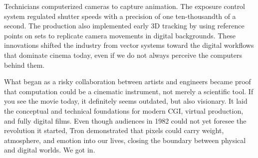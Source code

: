 \documentclass[12pt]{article}
\begin{document}
Technicians computerized cameras to capture animation. The exposure control system regulated shutter speeds with a precision of one ten-thousandth of a second. The production also implemented early 3D tracking by using reference points on sets to replicate camera movements in digital backgrounds. These innovations shifted the industry from vector systems toward the digital workflows that dominate cinema today, even if we do not always perceive the computers behind them.

What began as a risky collaboration between artists and engineers became proof that computation could be a cinematic instrument, not merely a scientific tool. If you see the movie today, it definitely seems outdated, but also visionary. It laid the conceptual and technical foundations for modern CGI, virtual production, and fully digital films. Even though audiences in 1982 could not yet foresee the revolution it started, Tron demonstrated that pixels could carry weight, atmosphere, and emotion into our lives, closing the boundary between physical and digital worlds. We got in.
\end{document}
